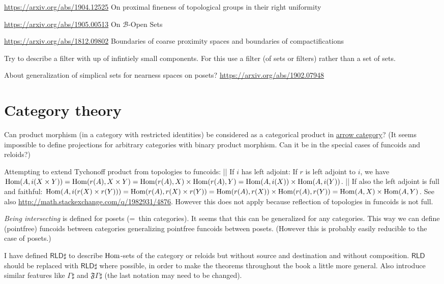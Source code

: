\documentclass{amsart}
\begin{document}
\url{https://arxiv.org/abs/1904.12525} On proximal fineness of topological groups in their right uniformity

\url{https://arxiv.org/abs/1905.00513}
On $\mathcal{B}$-Open Sets

\url{https://arxiv.org/abs/1812.09802} Boundaries of coarse proximity spaces and boundaries of compactifications

Try to describe a filter with up of infintiely small
components.
For this use a filter (of sets or filters) rather than a set
of sets.

About generalization of simplical sets for nearness spaces on posets?
\url{https://arxiv.org/abs/1902.07948}

\section{Category theory}

Can product morphism (in a category with restricted
identities) be considered as a categorical product
in \href{https://en.wikipedia.org/wiki/Comma_category#Arrow_category}{arrow category}?
(It seems impossible to define projections for
arbitrary categories with binary product morphism.
Can it be in the special cases of funcoids and reloids?)

Attempting to extend Tychonoff product from topologies to funcoids:
|| If $i$ has left adjoint:
If $r$ is left adjoint to $i$, we have $\operatorname{Hom}(A, i(X\times Y)) = \operatorname{Hom}(r(A), X\times Y) = \operatorname{Hom}(r(A), X)\times \operatorname{Hom}(r(A), Y) = \operatorname{Hom}(A, i(X))\times \operatorname{Hom}(A, i(Y))$.
|| If also the left adjoint is full and faithful:
$\operatorname{Hom}(A, i(r(X)\times r(Y))) = \operatorname{Hom}(r(A), r(X)\times r(Y)) = \operatorname{Hom}(r(A), r(X))\times \operatorname{Hom}(r(A), r(Y)) = \operatorname{Hom}(A, X)\times \operatorname{Hom}(A, Y)$.
See also \url{http://math.stackexchange.com/q/1982931/4876}. However this does not apply because reflection of topologies in funcoids
is not full.

\emph{Being intersecting} is defined for posets (=~thin categories). It seems that this can be generalized for any categories.
This way we can define (pointfree) funcoids between categories generalizing pointfree funcoids between posets.
(However this is probably easily reducible to the case of posets.)

I have defined $\mathsf{RLD}\sharp$ to describe $\operatorname{Hom}$-sets of the category or reloids but without source and destination and without composition.
$\mathsf{RLD}$ should be replaced with $\mathsf{RLD}\sharp$ where possible, in order to make the theorems throughout the book a little more general.
Also introduce similar features like $\Gamma\sharp$ and $\mathfrak{F}\Gamma\sharp$ (the last notation may need to be changed).
\end{document}
